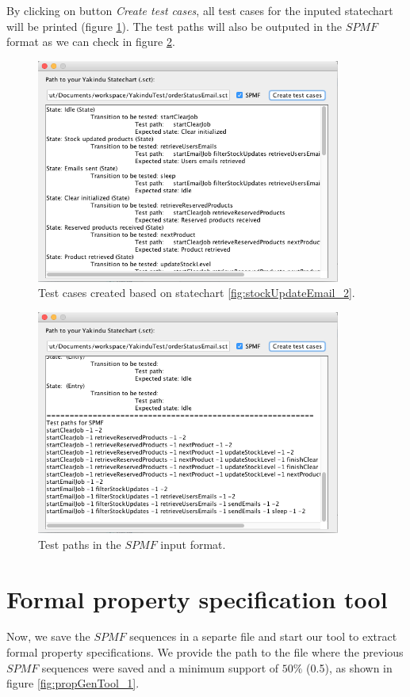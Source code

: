 By clicking on button \textit{Create test cases}, all test cases for the inputed statechart will be printed (figure \ref{fig:testGenTool_2}). The test paths will also be outputed in the $SPMF$ format as we can check in figure \ref{fig:testGenTool_3}.

\begin{figure}[htb]
\centering
\includegraphics[width=10cm]{figuras/testGenTool_2}
\caption{\label{fig:testGenTool_2} Test cases created based on statechart \ref{fig:stockUpdateEmail_2}.}
\end{figure}

\begin{figure}[htb]
\centering
\includegraphics[width=10cm]{figuras/testGenTool_3}
\caption{\label{fig:testGenTool_3} Test paths in the $SPMF$ input format.}
\end{figure}

\section{Formal property specification tool}

Now, we save the $SPMF$ sequences in a separte file and start our tool to extract formal property specifications. We provide the path to the file where the previous $SPMF$ sequences were saved and a minimum support of $50\%$ (0.5), as shown in figure \ref{fig:propGenTool_1}.


